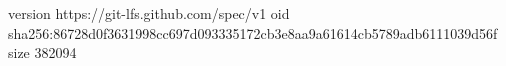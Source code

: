 version https://git-lfs.github.com/spec/v1
oid sha256:86728d0f3631998cc697d093335172cb3e8aa9a61614cb5789adb6111039d56f
size 382094

